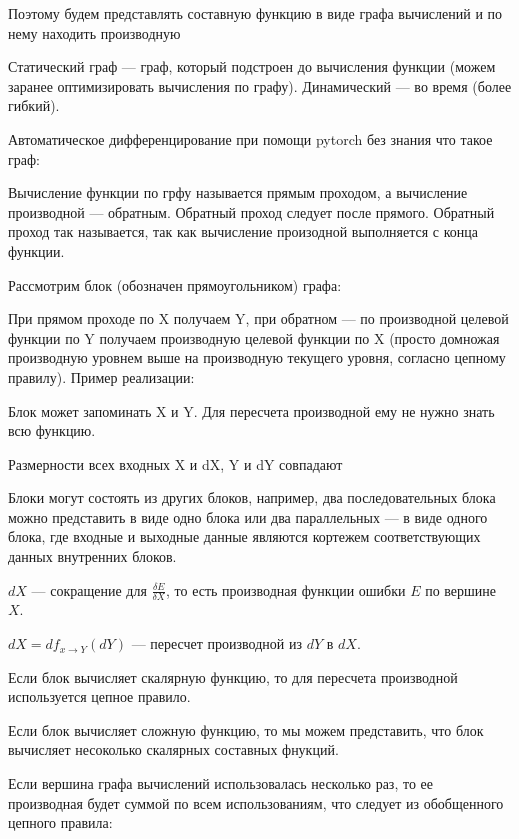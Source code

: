 
Поэтому будем представлять составную функцию в виде графа вычислений и по нему
находить производную


Статический граф --- граф, который подстроен до вычисления функции (можем
заранее оптимизировать вычисления по графу). Динамический --- во время (более гибкий).

Автоматическое дифференцирование при помощи pytorch без знания что такое граф:


Вычисление функции по грфу называется прямым проходом, а вычисление производной
--- обратным. Обратный проход следует после прямого. Обратный проход так
называется, так как вычисление произодной выполняется с конца функции.

Рассмотрим блок (обозначен прямоугольником) графа:


При прямом проходе по X получаем Y, при обратном --- по производной целевой
функции по Y получаем производную целевой функции по X (просто домножая
производную уровнем выше на производную текущего уровня, согласно цепному
правилу). Пример реализации:


Блок может запоминать X и Y. Для пересчета производной ему не нужно знать всю
функцию.

Размерности всех входных X и dX, Y и dY совпадают


Блоки могут состоять из других блоков, например, два последовательных блока
можно представить в виде одно блока или два параллельных --- в виде одного
блока, где входные и выходные данные являются кортежем соответствующих данных
внутренних блоков.

$dX$ --- сокращение для $\frac{\delta E}{\delta X}$, то есть производная
функции ошибки $E$ по вершине $X$.

$dX = df_{x \to Y}(dY)$ --- пересчет производной из $dY$ в $dX$.

Если блок вычисляет скалярную функцию, то для пересчета производной
используется цепное правило. 

Если блок вычисляет сложную функцию, то мы можем представить, что блок
вычисляет несоколько скалярных составных фнукций.

Если вершина графа вычислений использовалась несколько раз, то ее производная
будет суммой по всем использованиям, что следует из обобщенного цепного
правила:

